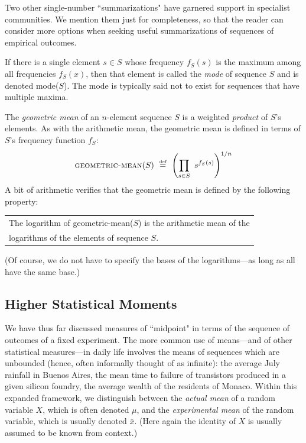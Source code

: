 Two other single-number ``summarizations" have garnered support in specialist communities.  We mention them just for completeness, so that the reader can consider more options when seeking useful summarizations of sequences of empirical outcomes.

\medskip

 

\noindent
If there is a single element $s \in S$ whose frequency $f_S(s)$ is the maximum among all frequencies $f_S(x)$, then that element is called the {\em mode} of sequence $S$ and is denoted {\sc mode}($S$).  The mode is typically said not to exist for sequences that have multiple maxima.

\medskip

   

\noindent
The {\it geometric mean} of an $n$-element sequence $S$ is a weighted {\em product} of $S$'s elements.  As with the arithmetic mean, the geometric mean is defined in terms of $S$'s frequency function $f_S$:
\[ \mbox{\sc geometric-mean}(S) \ \stackrel{\mbox{{\tiny def}}}{=} \  \left(\prod_{s \in S} \ s^{f_S(s)} \right)^{1/n} \]
A bit of arithmetic verifies that the geometric mean is defined by the following property:

\smallskip

{\em 
\begin{tabular}{l}
The logarithm of {\sc geometric-mean}($S$) is the arithmetic mean of the \\
logarithms of the elements of sequence $S$.
\end{tabular}
}

\smallskip

\noindent
(Of course, we do not have to specify the bases of the logarithms---as long as all have the same base.)
 
\subsection{Higher Statistical Moments}
\label{sec:mean-plus-moments}


We have thus far discussed measures of ``midpoint" in terms of the sequence of outcomes of a fixed experiment.  The more common use of means---and of other statistical measures---in daily life involves the means of sequences which are unbounded (hence, often informally thought of as infinite): the average July rainfall in Buenos Aires, the mean time to failure of transistors produced in a given silicon foundry, the average wealth of the residents of Monaco.  Within this expanded framework, we distinguish between the {\em actual mean} of a random variable $X$, which is often denoted $\mu$, and the {\em experimental mean} of the random variable, which is usually denoted $\bar{x}$.  (Here again the identity of $X$ is usually assumed to be known from context.)

